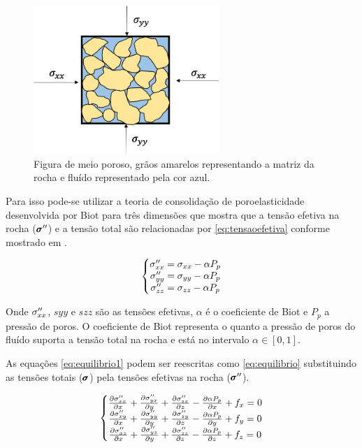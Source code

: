 \begin{figure}[!htbp]
\centering
\includegraphics[width=7cm]{chap01/figs/fluido_rocha_tensoes.png}
\caption{Figura de meio poroso, grãos amarelos representando a matriz da rocha e fluído representado pela cor azul.}
\label{fig:rochaComFluido}
\end{figure}

Para isso pode-se utilizar a teoria de consolidação de poroelasticidade desenvolvida por Biot para três dimensões que mostra que a tensão efetiva na rocha ($\pmb{\sigma}^{\prime\prime}$) e a tensão total são relacionadas por \eqref{eq:tensaoefetiva} conforme mostrado em \citet{ResGeomec}.


\begin{equation}
\label{eq:tensaoefetiva}
\left\{\begin{matrix}
 \sxx = \stxx - \alpha P_p \\
 \syy = \styy - \alpha P_p \\
 \szz = \stzz - \alpha P_p
\end{matrix}\right.
\end{equation}


Onde $\sigma^{\prime\prime}_{xx}$, $syy$  e $szz$ são as tensões efetivas, $\alpha$ é o coeficiente de Biot e $P_p$ a pressão de poros. O coeficiente de Biot representa o quanto a pressão de poros do fluído suporta a tensão total na rocha e está no intervalo $\alpha \in [0,1]$.

As equações \eqref{eq:equilibrio1} podem ser reescritas como \eqref{eq:equilibrio} substituindo as tensões totais ($\pmb{\sigma}$) pela tensões efetivas na rocha ($\pmb{\sigma}^{\prime\prime}$).

\begin{equation}
\label{eq:equilibrio}
\left\{\begin{matrix}
\dx[\sxx]  + \dy[\syx] + \dz[\szx] - \dx[\alpha P_p] + f_x   = 0
\\
\dx[\sxy]  + \dy[\syy] + \dz[\szy] - \dy[\alpha P_p]  + f_y   = 0
\\
\dx[\sxz]  + \dy[\syz] + \dz[\szz] - \dz[\alpha P_p] + f_z   = 0
\end{matrix}\right.
\end{equation}

